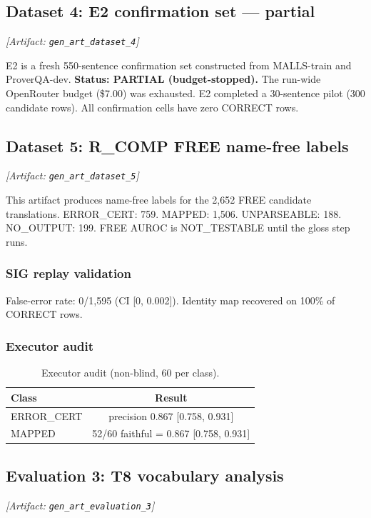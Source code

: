 \documentclass[11pt,letterpaper]{article}
\begin{document}
\subsection{Dataset 4: E2 confirmation set --- partial}
\label{sec:ds4}
\noindent\textit{[Artifact: \texttt{gen\_art\_dataset\_4}]}

E2 is a fresh 550-sentence confirmation set constructed from MALLS-train and ProverQA-dev. \textbf{Status: PARTIAL (budget-stopped).} The run-wide OpenRouter budget (\$7.00) was exhausted. E2 completed a 30-sentence pilot (300 candidate rows). All confirmation cells have zero CORRECT rows.

\subsection{Dataset 5: R\_COMP FREE name-free labels}
\label{sec:ds5}
\noindent\textit{[Artifact: \texttt{gen\_art\_dataset\_5}]}

This artifact produces name-free labels for the 2,652 FREE candidate translations.
ERROR\allowbreak\_\allowbreak CERT: 759. MAPPED: 1,506. UNPARSEABLE: 188. NO\allowbreak\_\allowbreak OUTPUT: 199.
FREE AUROC is NOT\allowbreak\_\allowbreak TESTABLE until the gloss step runs.

\subsubsection{SIG replay validation}

False-error rate: 0/1,595 (CI [0, 0.002]). Identity map recovered on 100\% of CORRECT rows.

\subsubsection{Executor audit}

\begin{table}[!htbp]
\centering
\caption{Executor audit (non-blind, 60 per class).}
\label{tab:executor_audit}
\begin{tabular}{lc}
\toprule
Class & Result \\
\midrule
ERROR\_CERT & precision 0.867 [0.758, 0.931] \\
MAPPED & 52/60 faithful = 0.867 [0.758, 0.931] \\
\bottomrule
\end{tabular}
\end{table}

\subsection{Evaluation 3: T8 vocabulary analysis}
\label{sec:eval3}
\noindent\textit{[Artifact: \texttt{gen\_art\_evaluation\_3}]}
\end{document}
